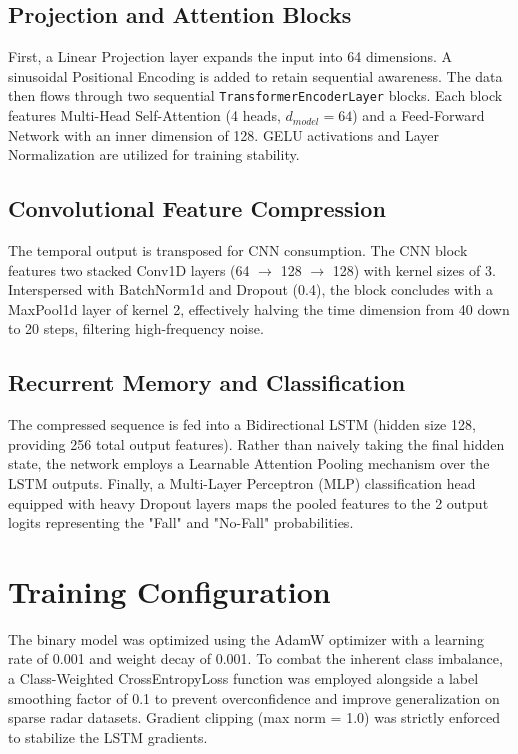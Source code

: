 \subsection{Projection and Attention Blocks}
First, a Linear Projection layer expands the input into 64 dimensions. A sinusoidal Positional Encoding is added to retain sequential awareness. The data then flows through two sequential \texttt{TransformerEncoderLayer} blocks. Each block features Multi-Head Self-Attention (4 heads, $d_{model}=64$) and a Feed-Forward Network with an inner dimension of 128. GELU activations and Layer Normalization are utilized for training stability.

\subsection{Convolutional Feature Compression}
The temporal output is transposed for CNN consumption. The CNN block features two stacked Conv1D layers (64 $\rightarrow$ 128 $\rightarrow$ 128) with kernel sizes of 3. Interspersed with BatchNorm1d and Dropout (0.4), the block concludes with a MaxPool1d layer of kernel 2, effectively halving the time dimension from 40 down to 20 steps, filtering high-frequency noise.

\subsection{Recurrent Memory and Classification}
The compressed sequence is fed into a Bidirectional LSTM (hidden size 128, providing 256 total output features). Rather than naively taking the final hidden state, the network employs a Learnable Attention Pooling mechanism over the LSTM outputs. Finally, a Multi-Layer Perceptron (MLP) classification head equipped with heavy Dropout layers maps the pooled features to the 2 output logits representing the "Fall" and "No-Fall" probabilities.

\section{Training Configuration}
The binary model was optimized using the AdamW optimizer with a learning rate of 0.001 and weight decay of 0.001. To combat the inherent class imbalance, a Class-Weighted CrossEntropyLoss function was employed alongside a label smoothing factor of 0.1 to prevent overconfidence and improve generalization on sparse radar datasets. Gradient clipping (max norm = 1.0) was strictly enforced to stabilize the LSTM gradients.
